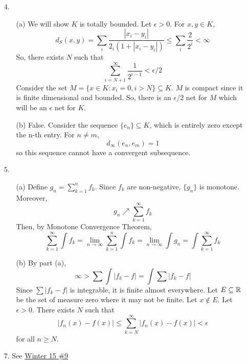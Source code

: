 \begin{itemize}

\item[4.]
	\begin{itemize}
		\item[(a)]
			We will show $K$ is totally bounded. Let $\epsilon >0$. For $x,y \in K$,
				\[ d_S(x,y) = \sum_i \dfrac{|x_i-y_i|}{2_i(1+|x_i-y_i|)} \le \sum_i \dfrac{2}{2^i} < \infty \]
			So, there exists $N$ such that
				\[ \sum_{i=N+1}^\infty \dfrac{1}{2^{i-1}} < \epsilon/2 \]
			Consider the set $M = \{ x \in K : x_i = 0 , i>N \} \subseteq K$. $M$ is compact since it is finite dimensional and bounded.
			So, there is an $\epsilon /2$ net for $M$ which will be an $\epsilon$ net for $K$.
		\item[(b)]
			False. Consider the sequence $\{e_n\}\subseteq K$, which is entirely zero except the n-th entry. For $n \ne m$,
				\[ d_\infty(e_n,e_m) = 1 \]
			so this sequence cannot have a convergent subsequence.
	\end{itemize}
\item[5.]
	\begin{itemize}
		\item[(a)]
			Define $g_n = \sum_{k=1}^n f_k$. Since $f_k$ are non-negative, $\{g_n\}$ is monotone. Moreover,
				\[ g_n \nearrow \sum_{k=1}^\infty f_k \]
			Then, by Monotone Convergence Theorem,
				\[ \sum_{k=1}^\infty \int f_k = \lim_{n \to \infty} \sum_{k=1}^n \int f_k = \lim_{n \to \infty} \int g_n
					= \int \sum_{k=1}^\infty f_k \]
		\item[(b)]
			By part (a),
				\[ \infty > \sum \int |f_k-f| = \int \sum |f_k-f| \]
			Since $\sum|f_k-f|$ is integrable, it is finite almost everywhere. Let $E \subseteq \mathbb{R}$ be the set of measure zero where it may not be finite.
			Let $x \not\in E$. Let $\epsilon >0$. There exists $N$ such that
				\[ |f_n(x)-f(x)| \le \sum_{k=N}^\infty |f_n(x)-f(x)| <\epsilon \]
			for all $n \ge N$.
	\end{itemize}

\item[7.] See \hyperref[q:w15-9]{Winter 15 \#9}
\end{itemize}